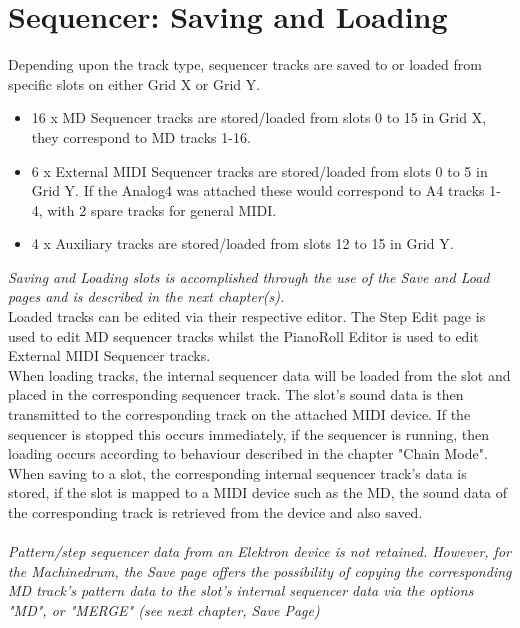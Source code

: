 \chapter{Sequencer: Saving and Loading}

Depending upon the track type, sequencer tracks are saved to or loaded from specific slots on either Grid X or Grid Y. 

\begin{itemize}
    \item 16 x MD Sequencer tracks are stored/loaded from slots 0 to 15 in Grid X, they correspond to MD tracks 1-16.
    \item 6 x External MIDI Sequencer tracks are stored/loaded from slots 0 to 5 in Grid Y. If the Analog4 was attached these would correspond to A4 tracks 1- 4, with 2 spare tracks for general MIDI.
    \item 4 x Auxiliary tracks are stored/loaded from slots 12 to 15 in Grid Y. 
\end{itemize}

\textit{Saving and Loading slots is accomplished through the use of the Save and Load pages and is described in the next chapter(s).}\\

Loaded tracks can be edited via their respective editor. The Step Edit page is used to edit MD sequencer tracks whilst the PianoRoll Editor is used to edit External MIDI Sequencer tracks.\\

When loading tracks, the internal sequencer data will be loaded from the slot and placed in the corresponding sequencer track. The slot's sound data is then transmitted to the corresponding track on the attached MIDI device. If the sequencer is stopped this occurs immediately, if the sequencer is running, then loading occurs according to behaviour described in the chapter "Chain Mode".\\

When saving to a slot, the corresponding internal sequencer track's data is stored, if the slot is mapped to a MIDI device such as the MD, the sound data of the corresponding track is retrieved from the device and also saved.\\
\\
\textit{Pattern/step sequencer data from an Elektron device is not retained. However, for the Machinedrum, the Save page offers the possibility of copying the corresponding MD track's pattern data to the slot's internal sequencer data via the options "MD", or "MERGE" (see next chapter, Save Page)}
\\\\

